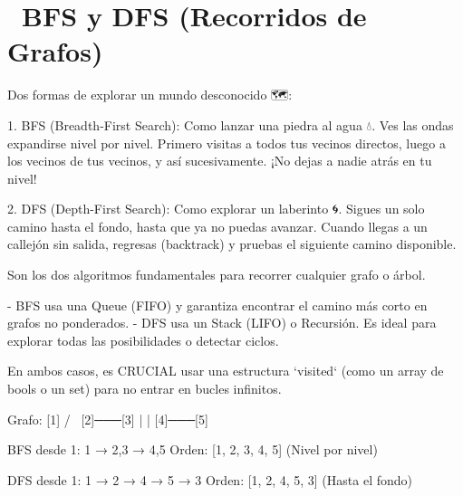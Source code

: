 ﻿\chapter[\emj{🧭}~BFS y DFS (Recorridos de Grafos)]{~BFS y DFS (Recorridos de Grafos)}

\begin{dsaquees}

Dos formas de explorar un mundo desconocido 🗺️:

1. BFS (Breadth-First Search): Como lanzar una piedra al agua 💧. 
   Ves las ondas expandirse nivel por nivel. Primero visitas a todos
   tus vecinos directos, luego a los vecinos de tus vecinos, y así 
   sucesivamente. ¡No dejas a nadie atrás en tu nivel!

2. DFS (Depth-First Search): Como explorar un laberinto 🌀. Sigues
   un solo camino hasta el fondo, hasta que ya no puedas avanzar. 
   Cuando llegas a un callejón sin salida, regresas (backtrack) y 
   pruebas el siguiente camino disponible.

\end{dsaquees}

\begin{dsaotraforma}

Son los dos algoritmos fundamentales para recorrer cualquier grafo 
o árbol. 

- BFS usa una Queue (FIFO) y garantiza encontrar el camino más corto
  en grafos no ponderados.
- DFS usa un Stack (LIFO) o Recursión. Es ideal para explorar todas 
  las posibilidades o detectar ciclos.

En ambos casos, es CRUCIAL usar una estructura `visited` (como un array
de bools o un set) para no entrar en bucles infinitos.

\end{dsaotraforma}

\begin{dsadiagrama}
Grafo:
    [1]
   /   \
 [2]───[3]
  |     |
 [4]───[5]

BFS desde 1: 1 → 2,3 → 4,5
Orden: [1, 2, 3, 4, 5] (Nivel por nivel)

DFS desde 1: 1 → 2 → 4 → 5 → 3
Orden: [1, 2, 4, 5, 3] (Hasta el fondo)
\end{dsadiagrama}


